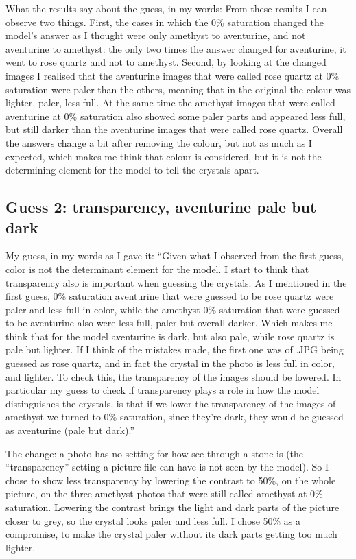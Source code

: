 \documentclass[11pt]{article}
\begin{document}
What the results say about the guess, in my words: From these results I can
observe two things. First, the cases in which the 0\% saturation changed the
model's answer as I thought were only amethyst to aventurine, and not
aventurine to amethyst: the only two times the answer changed for aventurine,
it went to rose quartz and not to amethyst. Second, by looking at the changed
images I realised that the aventurine images that were called rose quartz at
0\% saturation were paler than the others, meaning that in the original the
colour was lighter, paler, less full. At the same time the amethyst images that
were called aventurine at 0\% saturation also showed some paler parts and
appeared less full, but still darker than the aventurine images that were
called rose quartz. Overall the answers change a bit after removing the colour,
but not as much as I expected, which makes me think that colour is considered,
but it is not the determining element for the model to tell the crystals
apart.

\subsection*{Guess 2: transparency, aventurine pale but dark}

My guess, in my words as I gave it: ``Given what I observed from the first
guess, color is not the determinant element for the model. I start to think
that transparency also is important when guessing the crystals. As I mentioned
in the first guess, 0\% saturation aventurine that were guessed to be rose quartz
were paler and less full in color, while the amethyst 0\% saturation that were
guessed to be aventurine also were less full, paler but overall darker. Which
makes me think that for the model aventurine is dark, but also pale, while rose
quartz is pale but lighter. If I think of the mistakes made, the first one was
of .JPG being
guessed as rose quartz, and in fact the crystal in the photo is less full in
color, and lighter. To check this, the transparency of the images should be
lowered. In particular my guess to check if transparency plays a role in how
the model distinguishes the crystals, is that if we lower the transparency of
the images of amethyst we turned to 0\% saturation, since they're dark, they
would be guessed as aventurine (pale but dark).''

The change: a photo has no setting for how see-through a stone is (the
``transparency'' setting a picture file can have is not seen by the model). So I
chose to show less transparency by lowering the contrast to 50\%, on the whole
picture, on the three amethyst photos that were still called amethyst at 0\%
saturation. Lowering the contrast brings the light and dark parts of the picture
closer to grey, so the crystal looks paler and less full. I chose 50\% as a
compromise, to make the crystal paler without its dark parts getting too much
lighter.
\end{document}
